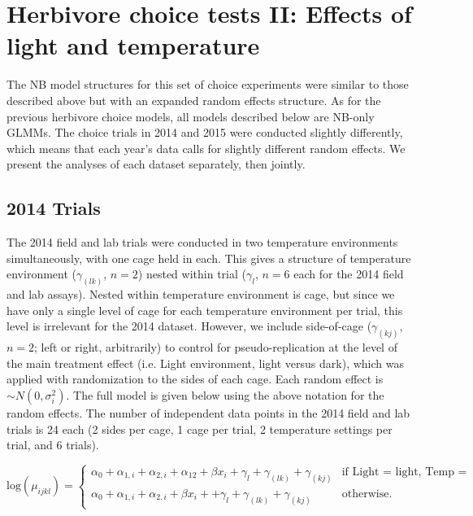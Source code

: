\documentclass[11pt, oneside]{amsart}
\begin{document}
\section{Herbivore choice tests II: Effects of light and temperature}

The NB model structures for this set of choice experiments were similar to those described above but with an expanded random effects structure. As for the previous herbivore choice models, all models described below are NB-only GLMMs. The choice trials in 2014 and 2015 were conducted slightly differently, which means that each year's data calls for slightly different random effects. We present the analyses of each dataset separately, then jointly.

\subsection{2014 Trials}

The 2014 field and lab trials were conducted in two temperature environments simultaneously, with one cage held in each. This gives a structure of temperature environment ($\gamma_{(lk)}$, $n=2$) nested within trial ($\gamma_{l}$, $n=6$ each for the 2014 field and lab assays). Nested within temperature environment is cage, but since we have only a single level of cage for each temperature environment per trial, this level is irrelevant for the 2014 dataset. However, we include side-of-cage ($\gamma_{(kj)}$, $n=2$; left or right, arbitrarily) to control for pseudo-replication at the level of the main treatment effect (i.e. Light environment, light versus dark), which was applied with randomization to the sides of each cage. Each random effect is $\sim N(0,\sigma_i^2)$. The full model is given below using the above notation for the random effects. The number of independent data points in the 2014 field and lab trials is 24 each (2 sides per cage, 1 cage per trial, 2 temperature settings per trial, and 6 trials).

\begin{equation}
\text{log}(\mu_{ijkl}) = \begin{cases}
\alpha_0 + \alpha_{1,i} + \alpha_{2,i} + \alpha_{12} + \beta x_i + \gamma_l + \gamma_{(lk)} + \gamma_{(kj)}
& \text{if Light = light, Temp = warm}\\
\alpha_0 + \alpha_{1,i} + \alpha_{2,i} + \beta x_i + + \gamma_l + \gamma_{(lk)} + \gamma_{(kj)} 	  		 
& \text{otherwise}.
\end{cases}
\end{equation}
\end{document}
